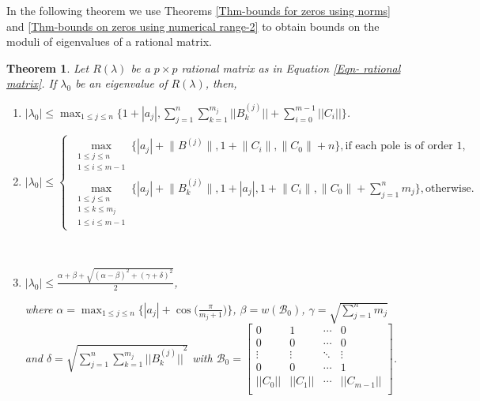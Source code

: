 \documentclass[12pt, reqno]{amsart}
\newtheorem{theorem}{Theorem}[section]
\theoremstyle{definition}
\theoremstyle{remark}
\numberwithin{equation}{section}
\begin{document}
\medskip
In the following theorem we use Theorems \ref{Thm-bounds for zeros using norms} and 
\ref{Thm-bounds on zeros using numerical range-2} to obtain bounds on the moduli of 
eigenvalues of a rational matrix.

\begin{theorem}\label{Thm summary}
Let $R(\lambda)$ be a $p \times p$ rational matrix as in Equation 
\eqref{Eqn- rational matrix}. If $\lambda_0$ be an eigenvalue of $R(\lambda)$, then,

\begin{enumerate}
\item $\displaystyle  |\lambda_0| \leq \max_{1 \leq j \leq n} \bigg\{1+|a_j|, 
\sum_{j=1}^{n} \sum_{k=1}^{m_j}||B_k^{(j)}||+ \sum_{i=0}^{m-1}||C_i|| \bigg\}$.

\item {\small \[
|\lambda_0| \leq 
\begin{cases}
  \displaystyle\max_{\substack{1 \leq j \leq n \\ 1 \leq i \leq m-1}} \bigg\{|a_j| 
  + \big\|B^{(j)}\big\|, 1 + \big\|C_i\big\|, \big\|C_0\big\| + n \bigg\}, 
  \text{if each pole is of order $1$}, \\
  \displaystyle\max_{\substack{1 \leq j \leq n \\ 1 \leq k \leq m_j \\ 1 \leq i 
  \leq m-1}} \bigg\{|a_j| + \big\|B_k^{(j)}\big\|, 1 + |a_j|, 1 + \big\|C_i\big\|, 
  \big\|C_0\big\| + \sum_{j=1}^{n}m_j \bigg\}, \text{otherwise}.
\end{cases}
\]}

\

\item $|\lambda_0| \leq \displaystyle \frac{\alpha+ \beta +\sqrt{(\alpha-\beta)^2 + 
(\gamma+\delta)^2}}{2}$,

where $\alpha = \displaystyle \max_{1 \leq j \leq n} \Big\{|a_j| + 
\cos\Big(\frac{\pi}{m_j+1}\Big) \Big\}$, $\beta = w(\mathcal{B}_0)$, $\gamma =
\sqrt{\displaystyle \sum_{j=1}^{n} m_j}$ and $\delta = \sqrt{ \displaystyle 
\sum_{j=1}^{n}\sum_{k=1}^{m_j} {||B_{k}^{(j)}||}^2}$ with $\mathcal{B}_0 = 
\begin{bmatrix}
0 & 1  & \cdots & 0\\
0 & 0 & \cdots & 0\\
\vdots  & \vdots & \ddots & \vdots\\
0 & 0 & \cdots & 1\\
||C_0|| & ||C_1|| & \cdots & ||C_{m-1}||\\ 
\end{bmatrix}$.
\end{enumerate}
\end{theorem}
\end{document}
